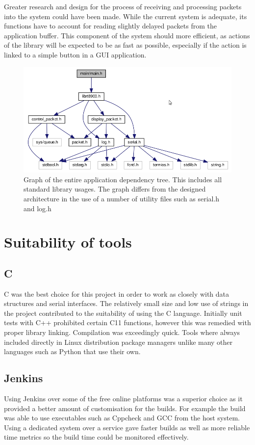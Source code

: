 Greater research and design for the process of receiving and processing packets into the system could have been made. While the current system is adequate, its functions have to account for reading slightly delayed packets from the application buffer. This component of the system should more efficient, as actions of the library will be expected to be as fast as possible, especially if the action is linked to a simple button in a GUI application.

\begin{figure}[h!]
    \centering
    \includegraphics[width=1\textwidth]{img/dependancy_graph.png}
    \caption[Dependency graph]{Graph of the entire application dependency tree. This includes all standard library usages. The graph differs from the designed architecture in the use of a number of utility files such as serial.h and log.h}
    \label{fig:dependency_graph}
\end{figure}

\section{Suitability of tools}
\subsection*{C}
C was the best choice for this project in order to work as closely with data structures and serial interfaces. The relatively small size and low use of strings in the project contributed to the suitability of using the C language. Initially unit tests with C++ prohibited certain C11 functions, however this was remedied with proper library linking. Compilation was exceedingly quick. Tools where always included directly in Linux distribution package managers unlike many other languages such as Python that use their own. 

\subsection*{Jenkins}
Using Jenkins over some of the free online platforms was a superior choice as it provided a better amount of customisation for the builds. For example the build was able to use executables such as Cppcheck and GCC from the host system. Using a dedicated system over a service gave faster builds as well as more reliable time metrics so the build time could be monitored effectively.

